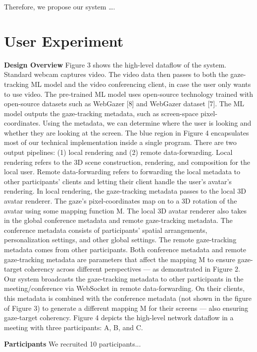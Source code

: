 \documentclass[sigconf,authordraft]{acmart}
\begin{document}
Therefore, we propose our system ….


\newline
\section{User Experiment}
\newline
\textbf{Design Overview}
\newline
Figure 3 shows the high-level dataflow of the system. Standard webcam captures video. The video data then passes to both the gaze-tracking ML model and the video conferencing client, in case the user only wants to use video. The pre-trained ML model uses open-source technology trained with open-source datasets such as WebGazer [8] and WebGazer dataset [7]. The ML model outputs the gaze-tracking metadata, such as screen-space pixel-coordinates. Using the metadata, we can determine where the user is looking and whether they are looking at the screen. The blue region in Figure 4 encapsulates most of our technical implementation inside a single program. 
There are two output pipelines: (1) local rendering and (2) remote data-forwarding. Local rendering refers to the 3D scene construction, rendering, and composition for the local user. Remote data-forwarding refers to forwarding the local metadata to other participants’ clients and letting their client handle the user’s avatar’s rendering.
In local rendering, the gaze-tracking metadata passes to the local 3D avatar renderer. The gaze’s pixel-coordinates map on to a 3D rotation of the avatar using some mapping function M. The local 3D avatar renderer also takes in the global conference metadata and remote gaze-tracking metadata. The conference metadata consists of participants’ spatial arrangements, personalization settings, and other global settings. The remote gaze-tracking metadata comes from other participants. Both conference metadata and remote gaze-tracking metadata are parameters that affect the mapping M to ensure gaze-target coherency across different perspectives — as demonstrated in Figure 2. 
Our system broadcasts the gaze-tracking metadata to other participants in the meeting/conference via WebSocket in remote data-forwarding. On their clients, this metadata is combined with the conference metadata (not shown in the figure of Figure 3) to generate a different mapping M for their screens — also ensuring gaze-target coherency.
Figure 4 depicts the high-level network dataflow in a meeting with three participants: A, B, and C.

\newline
\textbf{Participants}
\newline
We recruited 10 participants...
\end{document}
